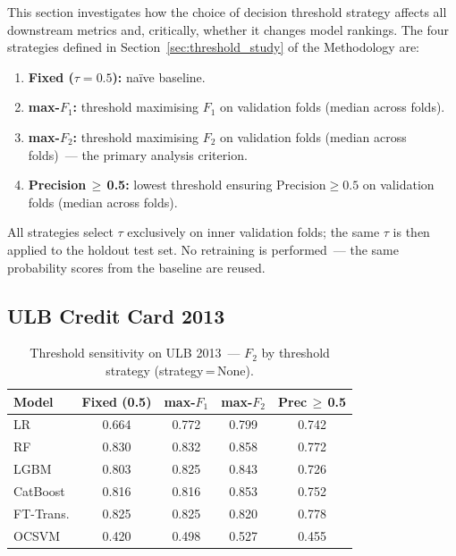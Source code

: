 This section investigates how the choice of decision threshold strategy
affects all downstream metrics and, critically, whether it changes model rankings.
The four strategies defined in Section~\ref{sec:threshold_study} of the Methodology are:
\begin{enumerate}
  \item \textbf{Fixed ($\tau=0.5$):} na\"ive baseline.
  \item \textbf{max-$F_1$:} threshold maximising $F_1$ on validation folds (median across folds).
  \item \textbf{max-$F_2$:} threshold maximising $F_2$ on validation folds (median across folds)~--- the primary analysis criterion.
  \item \textbf{Precision\,$\geq$\,0.5:} lowest threshold ensuring $\text{Precision} \geq 0.5$ on validation folds (median across folds).
\end{enumerate}

All strategies select $\tau$ exclusively on inner validation folds;
the same $\tau$ is then applied to the holdout test set.
No retraining is performed~--- the same probability scores from the baseline are reused.


\subsection{ULB Credit Card 2013}

\begin{table}[ht!]
\centering
\caption{Threshold sensitivity on ULB 2013~--- $F_2$ by threshold strategy (strategy\,=\,None).}
\label{tab:threshold_ulb_f2}
\begin{tabular}{l c c c c}
\toprule
Model & Fixed (0.5) & max-$F_1$ & max-$F_2$ & Prec\,$\geq$\,0.5 \\
\midrule
LR         & 0.664 & 0.772 & 0.799 & 0.742 \\
RF         & 0.830 & 0.832 & 0.858 & 0.772 \\
LGBM       & 0.803 & 0.825 & 0.843 & 0.726 \\
CatBoost   & 0.816 & 0.816 & 0.853 & 0.752 \\
FT-Trans.  & 0.825 & 0.825 & 0.820 & 0.778 \\
OCSVM      & 0.420 & 0.498 & 0.527 & 0.455 \\
\bottomrule
\end{tabular}
\end{table}

